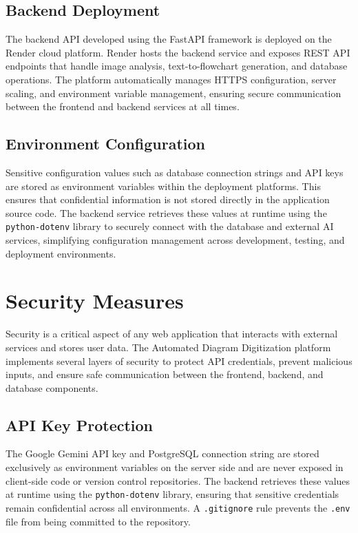 \subsection{Backend Deployment}
\label{subsec:backend-deploy}

The backend API developed using the FastAPI framework is 
deployed on the Render cloud platform. Render hosts the backend 
service and exposes REST API endpoints that handle image 
analysis, text-to-flowchart generation, and database 
operations. The platform automatically manages HTTPS 
configuration, server scaling, and environment variable 
management, ensuring secure communication between the frontend 
and backend services at all times.

\subsection{Environment Configuration}
\label{subsec:env-config}

Sensitive configuration values such as database connection 
strings and API keys are stored as environment variables within 
the deployment platforms. This ensures that confidential 
information is not stored directly in the application source 
code. The backend service retrieves these values at runtime 
using the \texttt{python-dotenv} library to securely connect 
with the database and external AI services, simplifying 
configuration management across development, testing, and 
deployment environments.

\section{Security Measures}
\label{sec:security}

Security is a critical aspect of any web application that 
interacts with external services and stores user data. The 
Automated Diagram Digitization platform implements several 
layers of security to protect API credentials, prevent 
malicious inputs, and ensure safe communication between the 
frontend, backend, and database 
components.

\subsection{API Key Protection}
\label{subsec:api-key}

The Google Gemini API key and PostgreSQL connection string are 
stored exclusively as environment variables on the server side 
and are never exposed in client-side code or version control 
repositories. The backend retrieves these values at runtime 
using the \texttt{python-dotenv} library, ensuring that 
sensitive credentials remain confidential across all 
environments. A \texttt{.gitignore} rule prevents the 
\texttt{.env} file from being committed to the 
repository.

